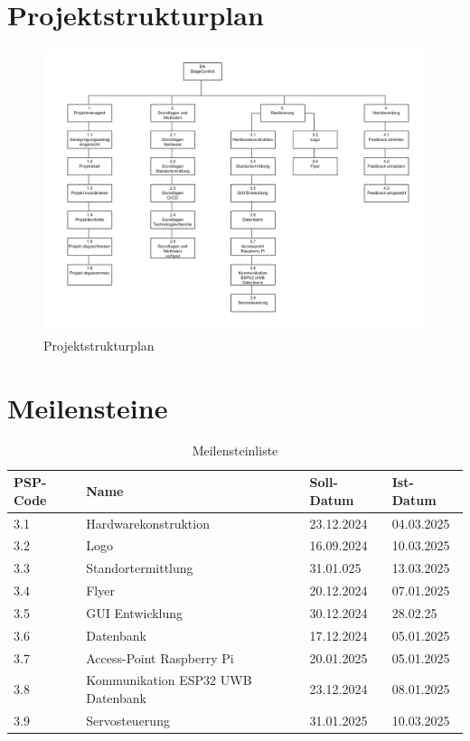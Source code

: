 \section*{Projektstrukturplan}
\begin{figure}[H]
	\centering
	\includegraphics[width=1.0\linewidth]{images/PSP.png}
	\caption[Projektstrukturplan]{Projektstrukturplan}
	\label{fig:projektstrukturplan}
\end{figure}
\newpage

\section*{Meilensteine}
\begin{table}[h]
	\centering
	\begin{tabular}{p{3cm} p{7cm} p{2cm} p{2cm}}
		\hline
		\textbf{PSP-Code} & \textbf{Name} & \textbf{Soll-Datum} & \textbf{Ist-Datum} \\
		\hline
		3.1 & Hardwarekonstruktion & 23.12.2024 & 04.03.2025 \\
		3.2 & Logo & 16.09.2024  & 10.03.2025 \\
		3.3 & Standortermittlung & 31.01.025 & 13.03.2025 \\
		3.4 & Flyer & 20.12.2024 & 07.01.2025 \\
		3.5 & GUI Entwicklung & 30.12.2024 & 28.02.25 \\
		3.6 & Datenbank & 17.12.2024 & 05.01.2025 \\
		3.7 & Access-Point Raspberry Pi & 20.01.2025 & 05.01.2025 \\
		3.8 & Kommunikation ESP32 UWB Datenbank & 23.12.2024  & 08.01.2025 \\
		3.9 & Servosteuerung & 31.01.2025 & 10.03.2025 \\
		\hline
	\end{tabular}
	\caption{Meilensteinliste}
	\label{tab:Meilensteinliste}
\end{table}
\newpage


